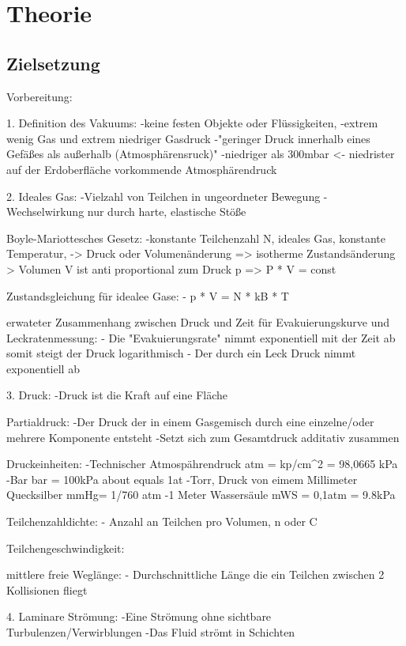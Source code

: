 \section{Theorie}

    \subsection{Zielsetzung}

       
Vorbereitung: 

	1. Definition des Vakuums:
		-keine festen Objekte oder Flüssigkeiten,
                -extrem wenig Gas und extrem niedriger Gasdruck
                -"geringer Druck innerhalb eines Gefäßes als außerhalb (Atmosphärensruck)"
                -niedriger als 300mbar <- niedrister auf der Erdoberfläche vorkommende Atmosphärendruck

	2. Ideales Gas:
		-Vielzahl von Teilchen in ungeordneter Bewegung
		-Wechselwirkung nur durch harte, elastische Stöße

	   Boyle-Mariottesches Gesetz:
		-konstante Teilchenzahl N, ideales Gas, konstante Temperatur, -> Druck oder Volumenänderung => isotherme Zustandsänderung
		 \-> Volumen V ist anti proportional zum Druck p => P * V = const 

	   Zustandsgleichung für idealee Gase:
		- p * V = N * kB * T

	   erwateter Zusammenhang zwischen Druck und Zeit für Evakuierungskurve und Leckratenmessung:
	   	- Die "Evakuierungsrate" nimmt exponentiell mit der Zeit ab somit steigt der Druck logarithmisch
		- Der durch ein Leck Druck nimmt exponentiell ab

	3. Druck:
		-Druck ist die Kraft auf eine Fläche

	   Partialdruck:
	   	-Der Druck der in einem Gasgemisch durch eine einzelne/oder mehrere Komponente entsteht
		-Setzt sich zum Gesamtdruck additativ zusammen

	   Druckeinheiten:
	   	-Technischer Atmospährendruck atm = kp/cm^2 = 98,0665 kPa 
		-Bar bar = 100kPa about equals 1at
		-Torr, Druck von eimem Millimeter Quecksilber mmHg= 1/760 atm
		-1 Meter Wassersäule mWS = 0,1atm = 9.8kPa

	   Teilchenzahldichte:
	   	- Anzahl an Teilchen pro Volumen, n oder C

	   Teilchengeschwindigkeit:

	   mittlere freie Weglänge:
	   	- Durchschnittliche Länge die ein Teilchen zwischen 2 Kollisionen fliegt

	4. Laminare Strömung:
		-Eine Strömung ohne sichtbare Turbulenzen/Verwirblungen
		-Das Fluid strömt in Schichten

